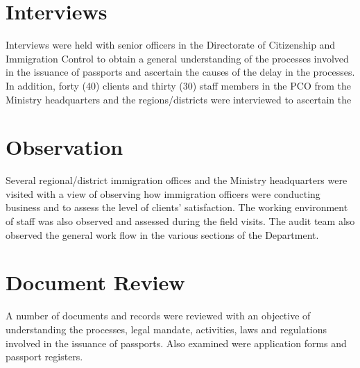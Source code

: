 \documentclass[]{report}
\begin{document}
 \section*{Interviews}
 Interviews were held with senior officers in the Directorate of Citizenship and Immigration Control to obtain a general understanding of the processes involved in the issuance of passports and ascertain the causes of the delay in the processes. In addition, forty (40) clients and thirty (30) staff members in the PCO from the Ministry headquarters and the regions/districts were interviewed to ascertain the 
  \paragraph{}
  \section*{Observation}
Several regional/district immigration offices and the Ministry headquarters were visited with a view of observing how immigration officers were conducting business and to assess the level of clients’ satisfaction. The working environment of staff was also observed and assessed during the field visits. The audit team also observed the general work flow in the various sections of the Department. 
\paragraph{}
\section*{Document Review}
A number of documents and records were reviewed with an objective of understanding the processes, legal mandate, activities, laws and regulations involved in the issuance of passports. Also examined were application forms and passport registers. 
\end{document}
